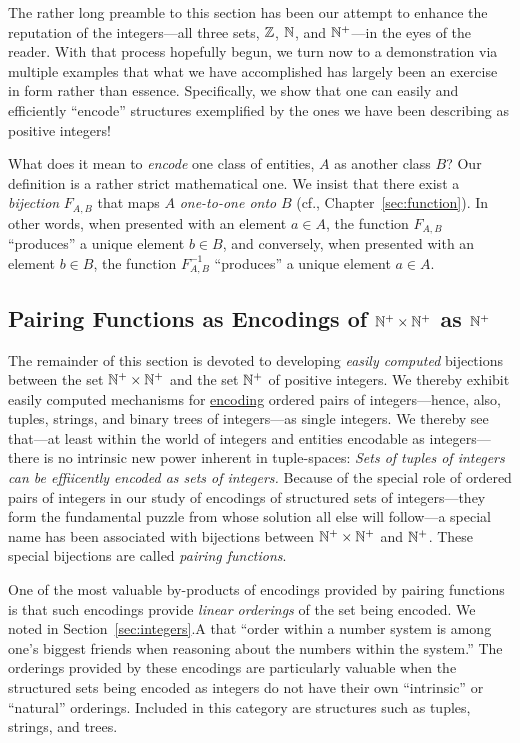 The rather long preamble to this section has been our attempt to
enhance the reputation of the integers---all three sets, $\mathbb{Z}$, $\mathbb{N}$,
and $\mathbb{N}^+$---in the eyes of the reader.  With that process hopefully
begun, we turn now to a demonstration via multiple examples that what
we have accomplished has largely been an exercise in form rather than
essence.  Specifically, we show that one can easily and efficiently
``encode'' structures exemplified by the ones we have been describing
as positive integers!

\medskip

\noindent
What does it mean to {\em encode}  one class of
  entities, $A$ as another class $B$?  Our definition is a rather
  strict mathematical one.  We insist that there exist a {\em
    bijection} $F_{A,B}$ that maps $A$ {\em one-to-one onto} $B$ (cf.,
  Chapter~\ref{sec:function}).  In other words, when presented with an
  element $a \in A$, the function $F_{A,B}$ ``produces'' a unique
  element $b \in B$, and conversely, when presented with an element $b
  \in B$, the function $F^{-1}_{A,B}$ ``produces'' a unique element $a
  \in A$.

\subsection{Pairing Functions as Encodings of $\mathbb{N}^+ \times \mathbb{N}^+$ as $\mathbb{N}^+$}
\label{sec:building-pairing-functions}

The remainder of this section is devoted to developing {\em easily
  computed} bijections between the set $\mathbb{N}^+ \times \mathbb{N}^+$ and the set
$\mathbb{N}^+$ of positive integers.  We thereby exhibit easily computed
mechanisms for \underline{encoding} ordered pairs of integers---hence,
also, tuples, strings, and binary trees of integers---as single
integers.  We thereby see that---at least within the world of integers
and entities encodable as integers---there is no intrinsic new power
inherent in tuple-spaces:  {\em Sets of tuples of
  integers can be effiicently encoded as sets of integers.}  Because
of the special role of ordered pairs of integers in our study of
encodings of structured sets of integers---they form the fundamental
puzzle from whose solution all else will follow---a special name has
been associated with bijections between $\mathbb{N}^+ \times \mathbb{N}^+$ and $\mathbb{N}^+$.
These special bijections are called {\it pairing functions}.

One of the most valuable by-products of encodings provided by pairing
functions is that such encodings provide {\em linear orderings} of the
set being encoded.  We noted in Section~\ref{sec:integers}.A that
``order within a number system is among one's biggest friends when
reasoning about the numbers within the system.''  The orderings
provided by these encodings are particularly
valuable when the structured sets being encoded as integers do not
have their own ``intrinsic'' or ``natural'' orderings.  Included in
this category are  structures such as tuples,
strings, and trees.

